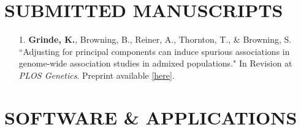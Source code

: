 \documentclass[margin]{res}
\begin{document}
\begin{resume}
\section{SUBMITTED MANUSCRIPTS}
\begin{itemize}
\item[1.] \textbf{Grinde, K.}, Browning, B., Reiner, A., Thornton, T., \& Browning, S. ``Adjusting for principal components can induce spurious associations in genome-wide association studies in admixed populations." In Revision at \textit{PLOS Genetics}. Preprint available \href{https://www.biorxiv.org/content/10.1101/2024.04.02.587682v1}{[here]}.\\

\end{itemize}


\section{SOFTWARE \& APPLICATIONS} 


\end{resume}
\end{document}
